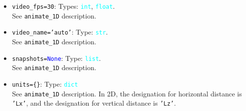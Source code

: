 \documentclass{article}
\newcommand{\ttt}[1]{\texttt{#1}}
\newcommand{\ptype}[1]{\texttt{\textcolor{cyan}{#1}}}
\newcommand{\cbl}[1]{\textcolor{blue}{#1}}
\newcommand{\cro}[1]{\textcolor{RedOrange}{#1}}
\newcommand{\cyo}[1]{\textcolor{YellowOrange}{#1}}
\begin{document}
\begin{itemize}
	\item \ttt{\cro{video\_fps}=30}: Types: \ptype{int}, \ptype{float}.\\See \ttt{animate\_1D} description.
	\item \ttt{\cro{video\_name}=\cyo{'auto'}}: Type: \ptype{str}.\\See \ttt{animate\_1D} description.
	\item \ttt{\cro{snapshots}=\cbl{None}}: Type: \ptype{list}.\\See \ttt{animate\_1D} description.
	\item \ttt{\cro{units}=\{\}}: Type: \ptype{dict}\\See \ttt{animate\_1D} description. In 2D, the designation for horizontal distance is \ttt{'Lx'}, and the designation for vertical distance is \ttt{'Lz'}.
\end{itemize}
\end{document}

